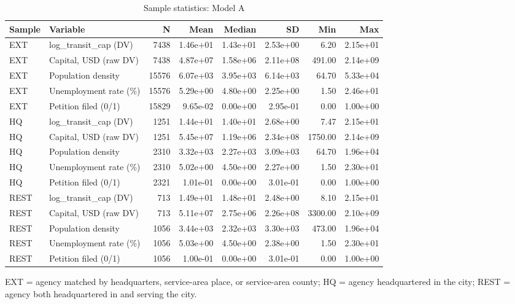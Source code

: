 \begin{table}

\caption{\label{tab:tab-sample-stats}Sample statistics: Model A}
\centering
\begin{threeparttable}
\begin{tabular}[t]{llrrrrrr}
\toprule
Sample & Variable & N & Mean & Median & SD & Min & Max\\
\midrule
EXT & log\_transit\_cap (DV) & 7438 & 1.46e+01 & 1.43e+01 & 2.53e+00 & 6.20 & 2.15e+01\\
EXT & Capital, USD (raw DV) & 7438 & 4.87e+07 & 1.58e+06 & 2.11e+08 & 491.00 & 2.14e+09\\
EXT & Population density & 15576 & 6.07e+03 & 3.95e+03 & 6.14e+03 & 64.70 & 5.33e+04\\
EXT & Unemployment rate (\%) & 15576 & 5.29e+00 & 4.80e+00 & 2.25e+00 & 1.50 & 2.46e+01\\
EXT & Petition filed (0/1) & 15829 & 9.65e-02 & 0.00e+00 & 2.95e-01 & 0.00 & 1.00e+00\\
\addlinespace
HQ & log\_transit\_cap (DV) & 1251 & 1.44e+01 & 1.40e+01 & 2.68e+00 & 7.47 & 2.15e+01\\
HQ & Capital, USD (raw DV) & 1251 & 5.45e+07 & 1.19e+06 & 2.34e+08 & 1750.00 & 2.14e+09\\
HQ & Population density & 2310 & 3.32e+03 & 2.27e+03 & 3.09e+03 & 64.70 & 1.96e+04\\
HQ & Unemployment rate (\%) & 2310 & 5.02e+00 & 4.50e+00 & 2.27e+00 & 1.50 & 2.30e+01\\
HQ & Petition filed (0/1) & 2321 & 1.01e-01 & 0.00e+00 & 3.01e-01 & 0.00 & 1.00e+00\\
\addlinespace
REST & log\_transit\_cap (DV) & 713 & 1.49e+01 & 1.48e+01 & 2.48e+00 & 8.10 & 2.15e+01\\
REST & Capital, USD (raw DV) & 713 & 5.11e+07 & 2.75e+06 & 2.26e+08 & 3300.00 & 2.10e+09\\
REST & Population density & 1056 & 3.44e+03 & 2.32e+03 & 3.30e+03 & 473.00 & 1.96e+04\\
REST & Unemployment rate (\%) & 1056 & 5.03e+00 & 4.50e+00 & 2.38e+00 & 1.50 & 2.30e+01\\
REST & Petition filed (0/1) & 1056 & 1.00e-01 & 0.00e+00 & 3.01e-01 & 0.00 & 1.00e+00\\
\bottomrule
\end{tabular}
\begin{tablenotes}[para]
\item EXT = agency matched by headquarters, service-area place, or service-area county; HQ = agency headquartered in the city; REST = agency both headquartered in and serving the city.
\end{tablenotes}
\end{threeparttable}
\end{table}
